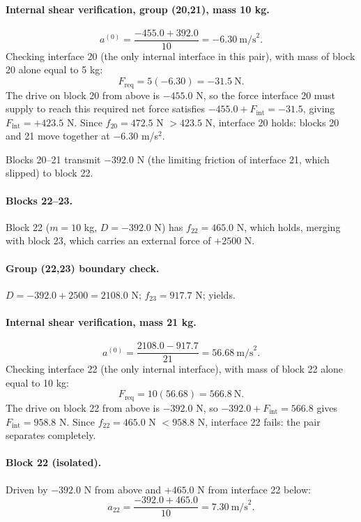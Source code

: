 \documentclass[11pt,a4paper]{article}
\begin{document}
\paragraph{Internal shear verification, group (20,21), mass 10 kg.}
\[
a^{(0)} = \frac{-455.0+392.0}{10} = -6.30\ \text{m/s}^2 .
\]
Checking interface 20 (the only internal interface in this pair), with mass of block 20 alone equal to 5 kg:
\[
F_{\mathrm{req}} = 5(-6.30) = -31.5\ \text{N}.
\]
The drive on block 20 from above is $-455.0$ N, so the force interface 20 must supply to reach this required net force satisfies $-455.0+F_{\mathrm{int}} = -31.5$, giving $F_{\mathrm{int}} = +423.5$ N. Since $f_{20}=472.5$ N $> 423.5$ N, interface 20 holds: blocks 20 and 21 move together at $-6.30$ m/s$^2$.

Blocks 20--21 transmit $-392.0$ N (the limiting friction of interface 21, which slipped) to block 22.

\paragraph{Blocks 22--23.} Block 22 ($m=10$ kg, $D=-392.0$ N) has $f_{22}=465.0$ N, which holds, merging with block 23, which carries an external force of $+2500$ N.

\paragraph{Group (22,23) boundary check.} $D = -392.0+2500 = 2108.0$ N; $f_{23}=917.7$ N; yields.

\paragraph{Internal shear verification, mass 21 kg.}
\[
a^{(0)} = \frac{2108.0-917.7}{21} = 56.68\ \text{m/s}^2 .
\]
Checking interface 22 (the only internal interface), with mass of block 22 alone equal to 10 kg:
\[
F_{\mathrm{req}} = 10(56.68) = 566.8\ \text{N}.
\]
The drive on block 22 from above is $-392.0$ N, so $-392.0+F_{\mathrm{int}} = 566.8$ gives $F_{\mathrm{int}} = 958.8$ N. Since $f_{22}=465.0$ N $< 958.8$ N, interface 22 fails: the pair separates completely.

\paragraph{Block 22 (isolated).} Driven by $-392.0$ N from above and $+465.0$ N from interface 22 below:
\[
a_{22} = \frac{-392.0+465.0}{10} = 7.30\ \text{m/s}^2 .
\]
\end{document}

